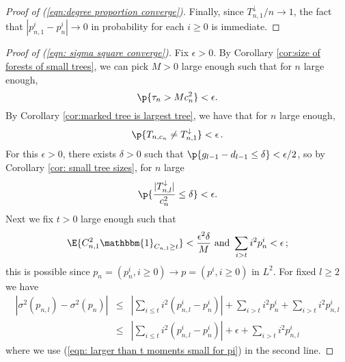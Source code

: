 \begin{proof}[Proof of (\ref{eqn:degree proportion converge})]
Finally, since $T_{n,1}^{\downarrow}/n \to 1$, the fact that $\left| p_{n,1}^i - p_n^i \right| \to 0$ in probability for each $i\ge 0$ is immediate.
\end{proof}
\begin{proof}[Proof of (\ref{eqn: sigma square converge})]
Fix $\epsilon>0$. By Corollary \ref{cor:size of forests of small trees}, we can pick $M>0$ large enough such that for $n$ large enough,
\begin{equation}\label{eqn:1_epsilon_term}
\p{\tau_n>Mc^2_n}<\epsilon. 
\end{equation} 
By Corollary \ref{cor:marked tree is largest tree}, we have that for $n$ large enough, 
\begin{equation}\label{eqn:2_epsilon_term}
\p{T_{n,c_n}\ne T^\downarrow_{n,1}}< \epsilon\, .
\end{equation}
For this $\epsilon>0$, there exists $\delta>0$ such that $\p{g_{l-1}-d_{l-1} \le\delta}<\epsilon/2$, so by Corollary \ref{cor: small tree sizes}, for $n$ large
\begin{equation}\label{eqn:3_epsilon_term}
\p{\frac{|T^\downarrow_{n,l}|}{c^2_n}\le\delta}<\epsilon.
\end{equation}
Next we fix $t>0$ large enough such that 
\begin{equation}\label{eqn: larger than t moments small for pi}
\E{C^2_{n,1}\mathbbm{1}_{C_{n,1}\ge t}}<\frac{\epsilon^2\delta}{M} \mbox{  and  } \sum\limits_{i>t}i^2p^i_n<\epsilon\, ;
\end{equation}
this is possible since $p_n=(p^i_n, i\ge 0)\to p=(p^i, i\ge 0)$ in $L^2$. 
For fixed $l\ge 2$ we have
\begin{eqnarray}\label{eqn:intermediate bounding second moment}
|\sigma^2(p_{n,l})-\sigma^2(p_n)|&\le&|\sum\limits_{i\le t} i^2(p^i_{n,l}-p^i_n)|+\sum\limits_{i>t}i^2p^i_n+\sum\limits_{i>t}i^2p^i_{n,l}\nonumber\\
&\le& |\sum\limits_{i\le t} i^2(p^i_{n,l}-p^i_n)|+\epsilon+\sum\limits_{i>t}i^2p^i_{n,l}
\end{eqnarray}
where we use (\ref{eqn: larger than t moments small for pi}) in the second line. 


\end{proof}
